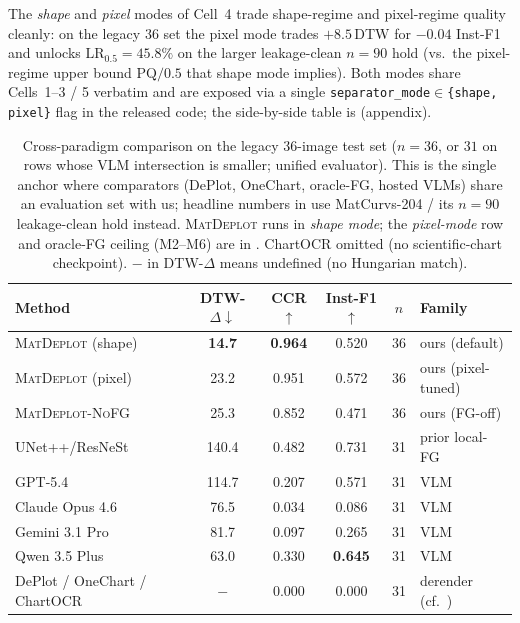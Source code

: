 \documentclass{article}
\begin{document}
The \emph{shape} and \emph{pixel} modes of Cell~4 trade
shape-regime and pixel-regime quality cleanly: on the legacy $36$ set
the pixel mode trades $+8.5$\,DTW for $-0.04$ Inst-F1 and unlocks
$\mathrm{LR}_{0.5}{=}45.8\%$ on the larger leakage-clean $n{=}90$ hold (vs.\
the pixel-regime upper bound $\mathrm{PQ}/0.5$ that shape mode
implies). Both modes share Cells~1--3 / 5 verbatim and are exposed
via a single \texttt{separator\_mode$\in$\{shape, pixel\}} flag in
the released code; the side-by-side table is
 (appendix).

\begin{table}[t]
\centering
\caption{Cross-paradigm comparison on the legacy $36$-image test
set ($n{=}36$, or $31$ on rows whose VLM intersection is smaller;
unified evaluator). This is the single anchor where comparators
(DePlot, OneChart, oracle-FG, hosted VLMs) share an evaluation set
with us; headline numbers in 
use MatCurvs-204 / its $n{=}90$ leakage-clean hold instead.
\textsc{MatDeplot} runs in \emph{shape mode}; the \emph{pixel-mode}
row and oracle-FG ceiling (M2--M6) are in \Cref{tab:t1-all-full}.
ChartOCR omitted (no scientific-chart checkpoint). $-$ in
DTW-$\Delta$ means undefined (no Hungarian match).}
\label{tab:t1-all}
\small
\setlength{\tabcolsep}{4pt}
\begin{tabular}{lccccl}
\toprule
Method & DTW-$\Delta\downarrow$ & CCR$\uparrow$ &
Inst-F1$\uparrow$ & $n$ & Family \\
\midrule
\textsc{MatDeplot} (shape)        & \textbf{14.7} & \textbf{0.964} & 0.520 & 36 & ours (default) \\
\textsc{MatDeplot} (pixel)        & 23.2          & 0.951          & 0.572 & 36 & ours (pixel-tuned) \\
\textsc{MatDeplot-NoFG}           & 25.3          & 0.852          & 0.471 & 36 & ours (FG-off) \\
UNet++/ResNeSt                    & 140.4         & 0.482          & 0.731 & 31 & prior local-FG \\
GPT-5.4                           & 114.7         & 0.207          & 0.571 & 31 & VLM \\
Claude Opus 4.6                   & 76.5          & 0.034          & 0.086 & 31 & VLM \\
Gemini 3.1 Pro                    & 81.7          & 0.097          & 0.265 & 31 & VLM \\
Qwen 3.5 Plus                     & 63.0          & 0.330          & \textbf{0.645} & 31 & VLM \\
DePlot / OneChart / ChartOCR      & $-$           & 0.000          & 0.000 & 31 & derender (cf.\ \Cref{tab:t1-all-full}) \\
\bottomrule
\end{tabular}
\end{table}
\end{document}
